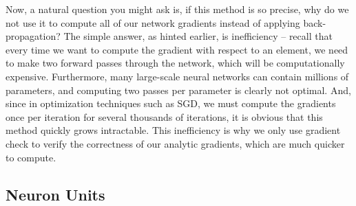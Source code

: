 Now, a natural question you might ask is, if this method is so precise, why do we not use it to compute all of our network gradients instead of applying back-propagation? The simple answer, as hinted earlier, is inefficiency -- recall that every time we want to compute the gradient with respect to an element, we need to make two forward passes through the network, which will be computationally expensive. Furthermore, many large-scale neural networks can contain millions of parameters, and computing two passes per parameter is clearly not optimal. And, since in optimization techniques such as SGD, we must compute the gradients once per iteration for several thousands of iterations, it is obvious that this method quickly grows intractable. This inefficiency is why we only use gradient check to verify the correctness of our analytic gradients, which are much quicker to compute.
\subsection{Neuron Units}

